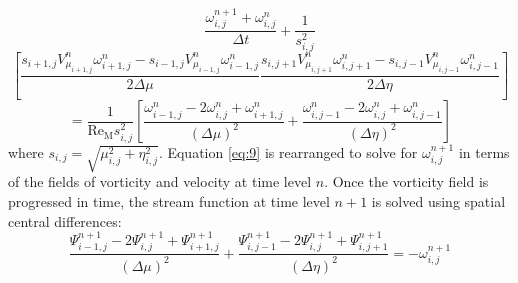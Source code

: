 \documentclass{article}
\begin{document}
\[
\frac{\omega^{n+1}_{i,j}+\omega^n_{i,j}}{\Delta t} + \frac{1}{s^2_{i,j}}
\]
\[
\left[
\frac{s_{i+1,j}V^n_{\mu_{i+1,j}}\omega^n_{i+1,j}-s_{i-1,j}V^n_{\mu_{i-1,j}}\omega^n_{i-1,j}}
     {2\Delta\mu}
\frac{s_{i,j+1}V^n_{\mu_{i,j+1}}\omega^n_{i,j+1}-s_{i,j-1}V^n_{\mu_{i,j-1}}\omega^n_{i,j-1}}
     {2\Delta\eta}
\right]
\]
\begin{equation}
\label{eq:9}
=\frac{1}{\text{Re}_\text{M}s^2_{i,j}}
\left[
\frac{\omega^n_{i-1,j}-2\omega^n_{i,j}+\omega^n_{i+1,j}}{(\Delta\mu)^2}
+
\frac{\omega^n_{i,j-1}-2\omega^n_{i,j}+\omega^n_{i,j-1}}{(\Delta\eta)^2}
\right]
\end{equation}
where $s_{i,j}=\sqrt{\mu^2_{i,j}+\eta^2_{i,j}}$.
Equation \ref{eq:9} is rearranged to solve for $\omega^{n+1}_{i,j}$ in terms of the fields of
vorticity and velocity at time level $n$.
Once the vorticity field is progressed in time, the stream
function at time level $n+1$ is solved using spatial central differences:
\begin{equation}
\frac{\Psi^{n+1}_{i-1,j}-2\Psi^{n+1}_{i,j}+\Psi^{n+1}_{i+1,j}}{(\Delta\mu)^2}+
\frac{\Psi^{n+1}_{i,j-1}-2\Psi^{n+1}_{i,j}+\Psi^{n+1}_{i,j+1}}{(\Delta\eta)^2}
=-\omega^{n+1}_{i,j}
\end{equation}
\end{document}
